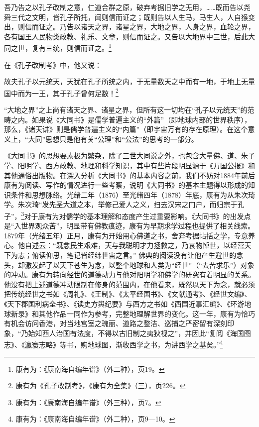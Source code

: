 \documentclass[a4paper, 12pt, openright]{ctexbook}
\renewenvironment{quote}
  {\list{}{\rightmargin2\ccwd \leftmargin2\ccwd \itemindent=2\ccwd \listparindent=2\ccwd}%
   \item\relax\small\kaishu\color{black}}
  {\endlist}
\begin{document}
\begin{quote}
吾乃告之以孔子改制之意，仁道合群之原，破弃考据旧学之无用，……既而告以尧舜三代之文明，皆孔子所托，闻则信而证之；既则告以人生马，马生人，人自猴变出，则信而证之。乃告以诸天之界，诸星之界，大地之界，人身之界，血轮之界，各有国王人民物类政教、礼乐、文章，则信而证之。又告以大地界中三世，后此大同之世，复有三统，则信而证之。\footnote{康有为：《康南海自编年谱》（外二种），页19。}
\end{quote}

在《孔子改制考》中，他又说：

\begin{quote}
故夫孔子以元统天，天犹在孔子所统之内，于无量数天之中而有一地，于地上无量国中而为一王，其于孔子曾何足数！\footnote{康有为《孔子改制考》，《康有为全集》（三），页226。}
\end{quote}

“大地之界”之上尚有诸天之界、诸星之界，但所有这一切均在“孔子以元统天”的范畴之内。如果说《大同书》是儒学普遍主义的“外篇”（即地球内部的世界秩序），那么，《诸天讲》则是儒学普遍主义的“内篇”（即宇宙万有的存在原理）。在这个意义上，“大同”思想只是他有关“公理”和“公法”的思考的一部分。

《大同书》的思想要素极为繁杂，除了三世大同说之外，也包含大量佛、道、朱子学、阳明学、西方政教、地理和科学知识，其中有些片段明显源于《万国公报》和其他通俗出版物。在深入分析《大同书》的基本内容之前，我们不妨对1884年前后康有为阅读、写作的情况进行一些考察，说明《大同书》的基本主题得以形成的知识条件和思想脉络。光绪二年（1876）至光绪四年（1878）年底，康有为从朱次琦学。朱次琦“发先圣大道之本，举修己爱人之义，扫去汉宋之门户，而归宗于孔子”，\footnote{康有为：《康南海自编年谱》（外三种），页7。}对于康有为对儒学的基本理解和态度产生过重要影响。《大同书》的出发点是“入世界观众苦”，明显带有佛教痕迹，康有为早期求学过程也提供了相关线索。1879年（光绪五年）正月，康有为开始用心佛道之书，舍弃考据帖括之学，专意养心。他自述云：“既念民生艰难，天与我聪明才力拯救之，乃哀物悼世，以经营天下为志；俯读仰思，笔记皆经纬世宙之言。” 佛典的阅读没有让他产生避世的念头，却激发起了以天下苍生为念，以整个地球和人类为“经世”（“去苦求乐”）对象的冲动。康有为转向经世的道德动力与他对阳明学和佛学的研究有着明显的关系。他没有把上述道德冲动限制在修身的范围内，在他看来，既然以天下为念，就必须把传统经世之书如《周礼》、《王制》、《太平经国书》、《文献通考》、《经世文编》、《天下郡国利病全书》、《读史方舆纪要》与西方之书如《西国近事汇编》、《环游地球新录》和其他作品一同作为参考，完整地理解世界的变化。这一年，康有为恰巧有机会访问香港，对当地宫室之瑰丽、道路之整洁、巡捕之严密留有深刻印象，“乃始知西人治国有法度，不得以古旧制之夷狄视之”，并因此“复阅《海国图志》、《瀛寰志略》等书，购地球图，渐收西学之书，为讲西学之基矣。”\footnote{康有为：《康南海自编年谱》（外二种），页9—10。}
\end{document}
